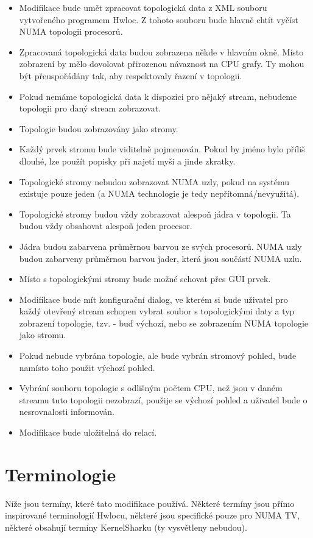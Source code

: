 \begin{itemize}
    \item Modifikace bude umět zpracovat topologická data z XML souboru vytvořeného programem Hwloc. Z tohoto souboru bude hlavně chtít vyčíst NUMA topologii procesorů.
    \item Zpracovaná topologická data budou zobrazena někde v hlavním okně. Místo zobrazení by mělo dovolovat přirozenou návaznost na CPU grafy. Ty mohou být přeuspořádány tak, aby respektovaly řazení v topologii.
    \item Pokud nemáme topologická data k dispozici pro nějaký stream, nebudeme topologii pro daný stream zobrazovat.
    \item Topologie budou zobrazovány jako stromy.
    \item Každý prvek stromu bude viditelně pojmenován. Pokud by jméno bylo příliš dlouhé, lze použít popisky při najetí myši a jinde zkratky.
    \item Topologické stromy nebudou zobrazovat NUMA uzly, pokud na systému existuje pouze jeden (a NUMA technologie je tedy nepřítomná/nevyužitá).
    \item Topologické stromy budou vždy zobrazovat alespoň jádra v topologii. Ta budou vždy obsahovat alespoň jeden procesor.
    \item Jádra budou zabarvena průměrnou barvou ze svých procesorů. NUMA uzly budou zabarveny průměrnou barvou jader, která jsou součástí NUMA uzlu.
    \item Místo s topologickými stromy bude možné schovat přes GUI prvek.
    \item Modifikace bude mít konfigurační dialog, ve kterém si bude uživatel pro každý otevřený stream schopen vybrat soubor s topologickými daty a typ zobrazení topologie, tzv.  - buď výchozí, nebo se zobrazením NUMA topologie jako stromu.
    \item Pokud nebude vybrána topologie, ale bude vybrán stromový pohled, bude namísto toho použit výchozí pohled. 
    \item Vybrání souboru topologie s odlišným počtem CPU, než jsou v daném streamu tuto topologii nezobrazí, použije se výchozí pohled a uživatel bude o nesrovnalosti informován.
    \item Modifikace bude uložitelná do relací.
\end{itemize}

\section{Terminologie}
Níže jsou termíny, které tato modifikace používá. Některé termíny jsou přímo inspirované terminologií Hwlocu, některé jsou specifické pouze pro NUMA TV, některé obsahují termíny KernelSharku (ty vysvětleny nebudou).

